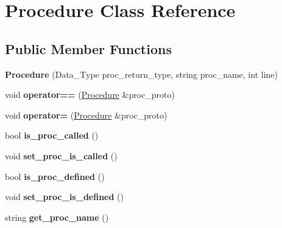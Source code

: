 \hypertarget{classProcedure}{}\section{Procedure Class Reference}
\label{classProcedure}
\subsection*{Public Member Functions}
\begin{DoxyCompactItemize}
\item 
\mbox{\label{classProcedure_a79f063eb825cc4653bf1801e01aefcef}} 
{\bfseries Procedure} (Data\+\_\+\+Type proc\+\_\+return\+\_\+type, string proc\+\_\+name, int line)
\item 
\mbox{\label{classProcedure_a9705537b086b1daac7a2ea66d00f39f7}} 
void {\bfseries operator==} (\hyperlink{classProcedure}{Procedure} \&proc\+\_\+proto)
\item 
\mbox{\label{classProcedure_ad97d178196729055a2e32de026f00e9d}} 
void {\bfseries operator=} (\hyperlink{classProcedure}{Procedure} \&proc\+\_\+proto)
\item 
\mbox{\label{classProcedure_a0ca44b3ef229d7c426ba83b6f13d3c21}} 
bool {\bfseries is\+\_\+proc\+\_\+called} ()
\item 
\mbox{\label{classProcedure_ae4f95fa42c39d41583e66fc0fcb4eeee}} 
void {\bfseries set\+\_\+proc\+\_\+is\+\_\+called} ()
\item 
\mbox{\label{classProcedure_a72476f6329f16a073c359622587664c4}} 
bool {\bfseries is\+\_\+proc\+\_\+defined} ()
\item 
\mbox{\label{classProcedure_a1fb033215886edb1461ce6b3dcd22519}} 
void {\bfseries set\+\_\+proc\+\_\+is\+\_\+defined} ()
\item 
\mbox{\label{classProcedure_a12a7f7e39647abf167d3145a8d2f0fee}} 
string {\bfseries get\+\_\+proc\+\_\+name} ()
\item 
\mbox{\label{classProcedure_a15f64b0ab32d0a4e8c7a685c24b5b284}} 

\end{DoxyCompactItemize}
